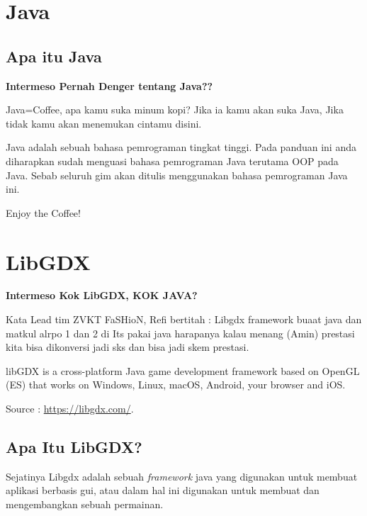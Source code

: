 \documentclass{article}
\newenvironment{info}
{\begin{mdframed}[
    linewidth=2pt,
    linecolor=info_color,
    backgroundcolor=white
]
}
{\end{mdframed}}
\newenvironment{intermeso}[1]
{\begin{mdframed}[
    linewidth=2pt,
    linecolor=green_color,
    backgroundcolor=green_color!10
]
\textbf{\large Intermeso #1}\par\vspace{0pt}
}
{\end{mdframed}}
\begin{document}
\newpage
\tableofcontents
\newpage

\section{Java}
\subsection{Apa itu Java}

\begin{intermeso}{Pernah Denger tentang Java??}
Java=Coffee, apa kamu suka minum kopi? Jika ia kamu akan suka Java, Jika tidak kamu akan menemukan cintamu disini.
\end{intermeso}

Java adalah sebuah bahasa pemrograman tingkat tinggi. Pada panduan ini anda
diharapkan sudah menguasi bahasa pemrograman Java terutama OOP pada Java.
Sebab seluruh gim akan ditulis menggunakan bahasa pemrograman Java ini.
\begin{info}
Enjoy the Coffee!
\end{info}

\newpage


\section{LibGDX}
\begin{intermeso}{Kok LibGDX, KOK JAVA?}
Kata Lead tim ZVKT FaSHioN, Refi bertitah : Libgdx framework buaat java dan matkul alrpo 1 dan 2 di Its pakai java harapanya kalau menang (Amin) prestasi kita bisa dikonversi jadi sks dan bisa jadi skem prestasi.
\end{intermeso}

\begin{info}
libGDX is a cross-platform Java game development framework based on OpenGL (ES) that works on Windows, Linux, macOS, Android, your browser and iOS. 

{\raggedleft
Source :  \url{https://libgdx.com/}.\par
}
\end{info}

\subsection{Apa Itu LibGDX?}
Sejatinya Libgdx adalah sebuah \textit{framework} java yang digunakan 
untuk membuat aplikasi berbasis gui, atau dalam hal ini digunakan untuk 
membuat dan mengembangkan sebuah permainan.
\end{document}

